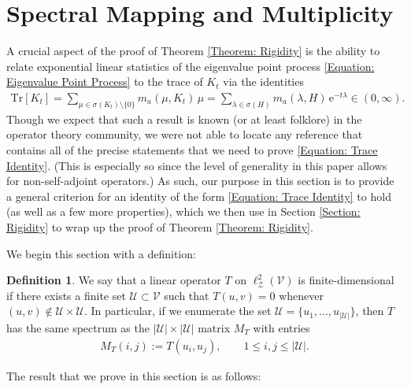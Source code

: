 \documentclass{amsart}
\numberwithin{equation}{section}
\theoremstyle{definition}
\newtheorem{definition}[theorem]{Definition}
\newcommand\la{\lambda}
\newcommand\si{\sigma}
\newcommand\mr{\mathrm}
\newcommand\ms{\mathscr}
\begin{document}
%



\section{Spectral Mapping and Multiplicity}
\label{sec: Multiplicity}

%

A crucial aspect of the proof of Theorem \ref{Theorem: Rigidity}
is the ability to relate exponential linear statistics of the eigenvalue point process
\eqref{Equation: Eigenvalue Point Process} to the trace of $K_t$ via the identities
\begin{align}
\label{Equation: Trace Identity}
\mr{Tr}[K_t]=\sum_{\mu\in\si(K_t)\setminus\{0\}}m_a(\mu,K_t)\,\mu=\sum_{\la\in\si(H)}m_a(\la,H)\,\mr e^{-t\la}\in(0,\infty).
\end{align}
Though we expect that such a result is known (or at least folklore) in the operator theory
community, we were not able to locate any reference that contains all of the precise statements
that we need to prove \eqref{Equation: Trace Identity}.
(This is especially so since the level of generality in this paper allows for non-self-adjoint
operators.)
As such, our purpose in this section
is to provide a general criterion for an identity of the form \eqref{Equation: Trace Identity}
to hold (as well as a few more properties), which we then use in Section \ref{Section: Rigidity}
to wrap up the proof of Theorem \ref{Theorem: Rigidity}.

%

We begin this section with a definition:

%

\begin{definition}
\label{Definition: Finite Dimensional}
We say that a linear operator $T$ on $\ell^2_\ms Z(\ms V)$
is finite-dimensional if there exists a finite set $\ms U\subset\ms V$
such that $T(u,v)=0$ whenever $(u,v)\not\in\ms U\times\ms U$.
In particular, if we enumerate the set $\ms U=\{u_1,\ldots,u_{|\ms U|}\}$, then $T$
has the same spectrum as the $|\ms U|\times |\ms U|$ matrix $M_T$ with entries
\begin{align}
\label{Equation: Matrix Representation}
M_T(i,j):=T(u_i,u_j),\qquad 1\leq i,j\leq |\ms U|.
\end{align}
\end{definition}

%

The result that we prove in this section is as follows:
\end{document}
